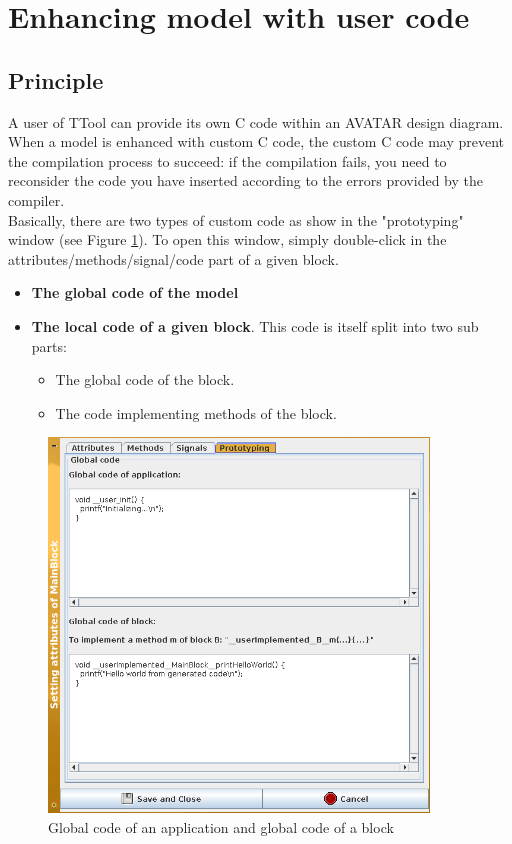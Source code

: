 \documentclass[12pt]{article}
\begin{document}
\newpage
\section{Enhancing model with user code}\label{sec:custom}

\subsection{Principle}
A user of TTool can provide its own C code within an AVATAR design diagram. When a model is enhanced with custom C code, the custom C code may prevent the compilation process to succeed: if the compilation fails, you need to reconsider the code you have inserted according to the errors provided by the compiler.\\
Basically, there are two types of custom code as show in the "prototyping" window (see Figure \ref{fig:customhelloworld}). To open this window, simply double-click in the attributes/methods/signal/code part of a given block.
\begin{itemize}
\item \textbf{The global code of the model}
\item \textbf{The local code of a given block}. This code is itself split into two sub parts:
\begin{itemize}
\item The global code of the block.
\item The code implementing methods of the block.
\end{itemize}
\end{itemize}

\begin{figure}[htbp]
\centering
\includegraphics[width=0.9\textwidth]{figures/customhelloworld}
\caption{Global code of an application and global code of a block} \label{fig:customhelloworld}
\end{figure}
\end{document}
